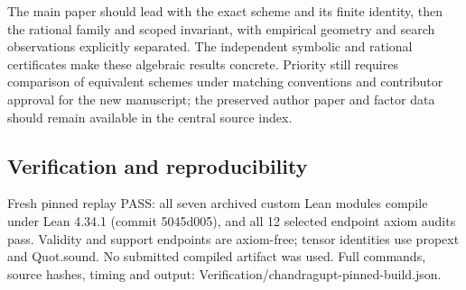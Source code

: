 \documentclass[11pt,a4paper]{article}
\begin{document}
The main paper should lead with the exact scheme and its finite identity, then the rational family and scoped invariant, with empirical geometry and search observations explicitly separated. The independent symbolic and rational certificates make these algebraic results concrete. Priority still requires comparison of equivalent schemes under matching conventions and contributor approval for the new manuscript; the preserved author paper and factor data should remain available in the central source index.

\subsection{Verification and reproducibility}
Fresh pinned replay PASS: all seven archived custom Lean modules compile under Lean 4.34.1 (commit 5045d005), and all 12 selected endpoint axiom audits pass. Validity and support endpoints are axiom-free; tensor identities use propext and Quot.sound. No submitted compiled artifact was used. Full commands, source hashes, timing and output: Verification/chandragupt-pinned-build.json.
\end{document}
